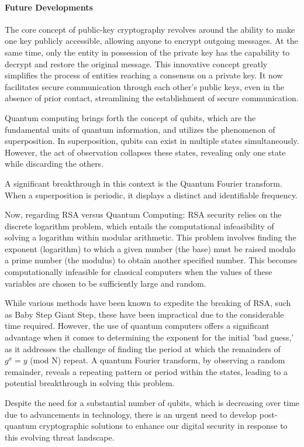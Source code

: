 \paragraph{Future Developments}
The core concept of public-key cryptography revolves around the ability to make one key publicly accessible, allowing anyone to encrypt outgoing messages. At the same time, only the entity in possession of the private key has the capability to decrypt and restore the original message. This innovative concept greatly simplifies the process of entities reaching a consensus on a private key. It now facilitates secure communication through each other's public keys, even in the absence of prior contact, streamlining the establishment of secure communication.

Quantum computing brings forth the concept of qubits, which are the fundamental units of quantum information, and utilizes the phenomenon of superposition. In superposition, qubits can exist in multiple states simultaneously. However, the act of observation collapses these states, revealing only one state while discarding the others.

A significant breakthrough in this context is the Quantum Fourier transform. When a superposition is periodic, it displays a distinct and identifiable frequency.

Now, regarding RSA versus Quantum Computing: RSA security relies on the discrete logarithm problem, which entails the computational infeasibility of solving a logarithm within modular arithmetic. This problem involves finding the exponent (logarithm) to which a given number (the base) must be raised modulo a prime number (the modulus) to obtain another specified number. This becomes computationally infeasible for classical computers when the values of these variables are chosen to be sufficiently large and random.

While various methods have been known to expedite the breaking of RSA, such as Baby Step Giant Step, these have been impractical due to the considerable time required. However, the use of quantum computers offers a significant advantage when it comes to determining the exponent for the initial 'bad guess,' as it addresses the challenge of finding the period at which the remainders of $g^x = y$ (mod N) repeat. A quantum Fourier transform, by observing a random remainder, reveals a repeating pattern or period within the states, leading to a potential breakthrough in solving this problem.

Despite the need for a substantial number of qubits, which is decreasing over time due to advancements in technology, there is an urgent need to develop post-quantum cryptographic solutions to enhance our digital security in response to this evolving threat landscape.